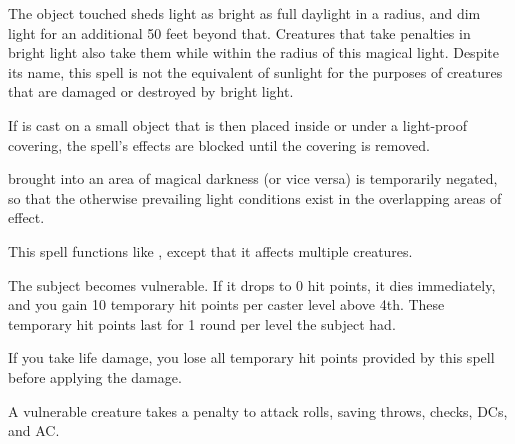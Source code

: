 \spellrng{\rngtouch}
\begin{spelleffect}
  The object touched sheds light as bright as full daylight in a \arealarge radius, and dim light for an additional 50 feet beyond that. Creatures that take penalties in bright light also take them while within the radius of this magical light. Despite its name, this spell is not the equivalent of sunlight for the purposes of creatures that are damaged or destroyed by bright light.
  \par If  is cast on a small object that is then placed inside or under a light-proof covering, the spell's effects are blocked until the covering is removed.
\end{spelleffect}
\begin{spellnotes}
   brought into an area of magical darkness (or vice versa) is temporarily negated, so that the otherwise prevailing light conditions exist in the overlapping areas of effect.
\end{spellnotes}

\spellrng{\rngmed}
\begin{spelleffect}
  This spell functions like , except that it affects multiple creatures.
\end{spelleffect}

\spellrng{\rngmed}
\begin{spellblood}
  The subject becomes vulnerable. If it drops to 0 hit points, it dies immediately, and you gain 10 temporary hit points  per caster level above 4th. These temporary hit points last for 1 round per level the subject had.

 If you take life damage, you lose all temporary hit points provided by this spell before applying the damage.
\end{spellblood}
\begin{spellnotes}
  A vulnerable creature takes a  penalty to attack rolls, saving throws, checks, DCs, and AC.
\end{spellnotes}

